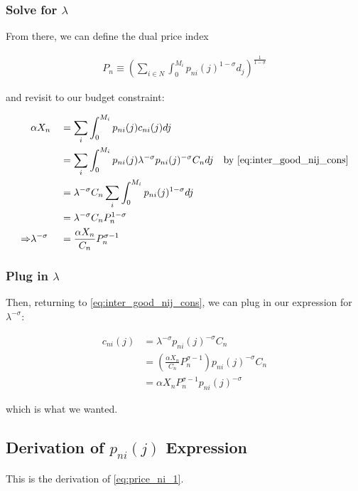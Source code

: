 \documentclass[10pt]{article}
\begin{document}
\subsubsection{Solve for $\lambda$}

From there, we can define the dual price index 

\begin{align}
    P_n \equiv \left(\sum_{i \in N} \int_0^{M_i} p_{n i}(j)^{1-\sigma} d_j \right)^{\frac{1}{1-\sigma}} \label{eq:price_index_p_n}
\end{align}

and revisit to our budget constraint:

\begin{alignat}{2}
    &\alpha X_n && = \sum_i \int_{0}^{M_i} p_{n i}(j) c_{n i}(j) d j \\
    &&&= \sum_i \int_{0}^{M_i} p_{n i}(j) \lambda^{-\sigma} p_{ni}(j)^{-\sigma} C_n d j \quad \text{by \eqref{eq:inter_good_nij_cons}} \\
    &&&= \lambda^{-\sigma} C_n \sum_i \int_{0}^{M_i} p_{n i}(j)^{1-\sigma} d j \\
    &&& = \lambda^{-\sigma} C_n P_n^{1-\sigma} \\
    \Rightarrow &\lambda^{-\sigma} &&= \frac{\alpha X_n}{C_n} P_n^{\sigma-1} \\
\end{alignat}

\subsubsection{Plug in $\lambda$}

Then, returning to \eqref{eq:inter_good_nij_cons}, we can plug in our expression for $\lambda^{-\sigma}$:

\begin{align}
    c_{n i}(j) &= \lambda^{-\sigma} p_{ni}(j)^{-\sigma} C_n \\
    &= \left(\frac{\alpha X_n}{C_n} P_n^{\sigma-1}\right) p_{ni}(j)^{-\sigma} C_n \\
    &= \alpha X_n P_n^{\sigma-1} p_{ni}(j)^{-\sigma}
\end{align}

which is what we wanted.



\subsection{Derivation of $p_{n i}(j)$ Expression}
\label{sec:price_ni_1}
This is the derivation of \eqref{eq:price_ni_1}.
\end{document}
